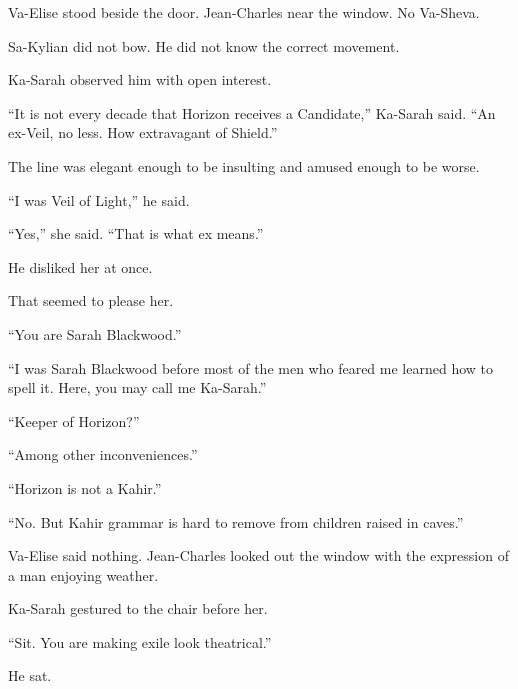 Va-Elise stood beside the door. Jean-Charles near the window. No Va-Sheva.\par

Sa-Kylian did not bow. He did not know the correct movement.\par

Ka-Sarah observed him with open interest.\par

“It is not every decade that Horizon receives a Candidate,” Ka-Sarah said. “An ex-Veil, no less. How extravagant of Shield.”\par

The line was elegant enough to be insulting and amused enough to be worse.\par

“I was Veil of Light,” he said.\par

“Yes,” she said. “That is what ex means.”\par

He disliked her at once.\par

That seemed to please her.\par

“You are Sarah Blackwood.”\par

“I was Sarah Blackwood before most of the men who feared me learned how to spell it. Here, you may call me Ka-Sarah.”\par

“Keeper of Horizon?”\par

“Among other inconveniences.”\par

“Horizon is not a Kahir.”\par

“No. But Kahir grammar is hard to remove from children raised in caves.”\par

Va-Elise said nothing. Jean-Charles looked out the window with the expression of a man enjoying weather.\par

Ka-Sarah gestured to the chair before her.\par

“Sit. You are making exile look theatrical.”\par

He sat.\par

